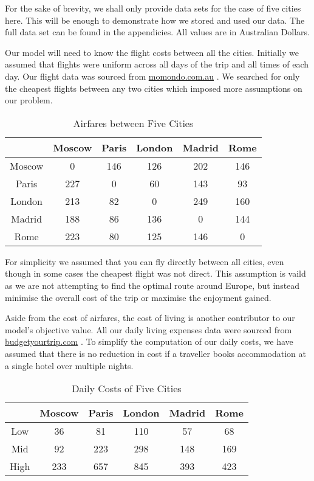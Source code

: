 \documentclass[12pt]{article}
\begin{document}
For the sake of brevity, we shall only provide data sets for the case of five cities here. This will be enough to demonstrate how we stored and used our data. The full data set can be found in the appendicies. All values are in Australian Dollars.

Our model will need to know the flight costs between all the cities. Initially we assumed that flights were uniform across all days of the trip and all times of each day. Our flight data was sourced from \url{momondo.com.au} \cite{momondo}. We searched for only the cheapest flights between any two cities which imposed more assumptions on our problem.

\begin{table}[h]
\caption{Airfares between Five Cities}
\centering
\vspace{1mm}
\begin{tabular}{c|c|c|c|c|c}
\hline
\rule{0pt}{2ex}  & Moscow & Paris & London & Madrid & Rome \\
\hline
\rule{0pt}{2ex}Moscow & 0 & 146 & 126 & 202 & 146 \\
Paris & 227 & 0 & 60 & 143 & 93 \\
London & 213 & 82 & 0 & 249 & 160 \\
Madrid & 188 & 86 & 136 & 0 & 144 \\
Rome & 223 & 80 & 125 & 146 & 0 \\

\end{tabular}
\end{table}

For simplicity we assumed that you can fly directly between all cities, even though in some cases the cheapest flight was not direct. This assumption is vaild as we are not attempting to find the optimal route around Europe, but instead minimise the overall cost of the trip or maximise the enjoyment gained. 

Aside from the cost of airfares, the cost of living is another contributor to our model's objective value. All our daily living expenses data were sourced from \url{budgetyourtrip.com} \cite{budget}. To simplify the computation of our daily costs, we have assumed that there is no reduction in cost if a traveller books accommodation at a single hotel over multiple nights.

\begin{table}[h]
\caption{Daily Costs of Five Cities}
\centering
\vspace{1mm}
\begin{tabular}{c|c|c|c|c|c}
\hline
\rule{0pt}{2ex}  & Moscow & Paris & London & Madrid & Rome \\
\hline
\rule{0pt}{2ex}Low & 36 & 81 & 110 & 57 & 68 \\
Mid & 92 & 223 & 298 & 148 & 169 \\
High & 233 & 657 & 845 & 393 & 423 \\

\end{tabular}
\end{table}
\end{document}
